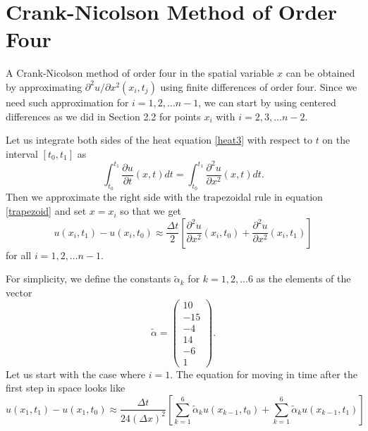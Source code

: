 \documentclass[00main.tex]{subfiles}
\begin{document}
\section{Crank-Nicolson Method of Order Four}






A Crank-Nicolson method of order four in the spatial variable $x$ can be obtained by approximating $\partial^2 u/\partial x^2 (x_i,t_j)$ using finite differences of order four. Since we need such approximation for $i=1,2,\hdots n-1$, we can start by using centered differences as we did in Section 2.2 for points $x_i$ with $i=2,3,\hdots n-2$.



Let us integrate both sides of the heat equation \eqref{heat3} with respect to $t$ on the interval $[t_0,t_1]$ as \[ \int_{t_0}^{t_1} \frac{\partial u}{\partial t} (x,t) dt = \int_{t_0}^{t_1} \frac{\partial^2 u}{\partial x^2} (x,t) dt .\] Then we approximate the right side with the trapezoidal rule in equation \eqref{trapezoid} and set $x=x_i$ so that we get \begin{equation}
u(x_i,t_1) - u(x_i,t_0) \approx \frac{\Delta t}{2} \left[ \frac{\partial^2 u}{\partial x^2} (x_i,t_0) + \frac{\partial^2 u}{\partial x^2} (x_i,t_1) \right]
\end{equation} for all $i=1, 2,\hdots n-1$.

For simplicity, we define the constants $\tilde{\alpha}_k$ for $k=1,2, \hdots 6$ as the elements of the vector \[ \tilde{\alpha} = \left( \begin{array}{c}
10\\ -15\\ -4\\ 14\\ -6\\ 1
\end{array} \right).\] Let us start with the case where $i=1$. The equation for moving in time after the first step in space looks like \[ u(x_1, t_1) - u(x_1, t_0) \approx \frac{\Delta t}{24 (\Delta x)^2} \left[ \sum_{k=1}^6 \tilde{\alpha}_k u(x_{k-1}, t_0) +  \sum_{k=1}^6 \tilde{\alpha}_k u(x_{k-1}, t_1) \right] \]
\end{document}
